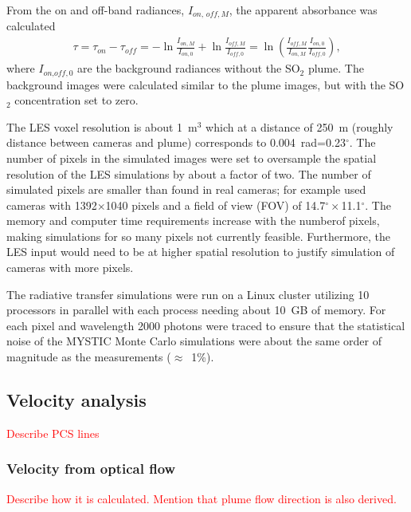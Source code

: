 \documentclass[amtd, manuscript]{copernicus}
\begin{document}
From the on and off-band radiances,  $I_{\textit{on, off},M}$, the
apparent absorbance was calculated \citep{MoriT2006a,Lubcke2013}
\begin{eqnarray}
\label{Eq:AA}
\tau = \tau_{\textit{on}}  - \tau_{\textit{off}} = -\ln \frac{I_{\textit{on},M}}{I_{\textit{on},0}}+\ln\frac{I_{\textit{off},M}}{I_{\textit{off},0}}
     = \ln \left(\frac{I_{\textit{off},M}}{I_{\textit{on},M}} \frac{I_{\textit{on},0}}{I_{\textit{off},0}}\right),
\end{eqnarray}
where $I_{\textit{on,off},0}$ are the background radiances without the SO$_2$ plume.
The background images were calculated similar to the plume images, but with the
SO$_2$ concentration set to zero.

The LES voxel resolution is about 1~m$^3$ which at a distance of 250~m
(roughly distance between cameras and plume) corresponds to
0.004~rad=0.23$^\circ$. The number of pixels in the simulated images
were set to oversample the spatial resolution of the LES simulations by about a
factor of two. The number of simulated pixels are  smaller than found
in real cameras; for example  \citet{Dinger2018} used cameras with
1392$\times$1040 pixels and a field of view (FOV) of
14.7$^\circ\times$11.1$^\circ$. The memory and computer time
requirements increase with the numberof pixels, making simulations for
so many pixels not currently feasible. Furthermore, the LES input
would need to be at higher spatial resolution to justify simulation of
cameras with more pixels.

The radiative transfer simulations were run on a Linux cluster
utilizing 10 processors in parallel with each process needing about
10~GB of memory. For each pixel and wavelength 2000 photons
were traced to ensure that the statistical noise of the MYSTIC Monte
Carlo simulations were  about the same order of magnitude as the
measurements ($\approx$~1\%).

\subsection{Velocity analysis}

\textcolor{red}{Describe PCS lines}

\subsubsection{Velocity from optical flow}
\textcolor{red}{Describe how it is calculated. Mention that plume flow
  direction is also derived.}
\end{document}

